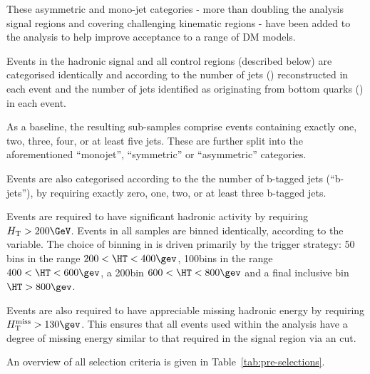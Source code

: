These asymmetric and mono-jet categories - more than doubling the analysis signal regions and covering challenging kinematic regions - have been added to
the analysis to help improve acceptance to a range of DM models.



Events in the hadronic signal and all control regions (described
below) are categorised identically and according to the number of jets
(\njet) reconstructed in each event and the number of jets identified
as originating from bottom quarks (\nb) in each event. 

As a baseline, the resulting sub-samples comprise events containing exactly one, two,
three, four, or at least five jets. These are further split into the aforementioned  ``monojet'', 
``symmetric'' or ``asymmetric'' \njet categories.

Events are also categorised according to the the number of b-tagged jets (``b-jets''), by
requiring exactly zero, one, two, or at least three b-tagged jets. 

Events are required to have significant hadronic activity by requiring
$\scalht > 200\GeV$.  Events in all samples are binned identically, according to the
\HT variable. The choice of binning in \HT is driven primarily by the trigger strategy: 50\gev
bins in the range $200 < \HT < 400\gev$, 100\gev bins in the range $400 < \HT < 600\gev$, a 200\gev bin $600<\HT<800\gev$ and a final 
inclusive bin $\HT > 800\gev$.

Events are also required to have appreciable missing hadronic energy by requiring $\mht>130\gev$. This ensures that all events used within
the analysis have a degree of missing energy similar to that required in the signal region via an \alphat cut. 

An overview of all selection criteria is given in Table~\ref{tab:pre-selections}.

